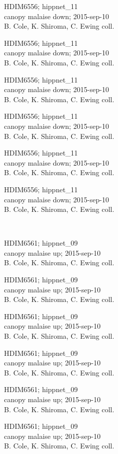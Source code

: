 \documentclass[2pt]{extarticle}
\begin{document}
\noindent
\parbox{0.16\textwidth}{\tiny \raggedright \rule[-0.3\baselineskip]{0pt}{10pt}HDIM6556; hippnet\_11\\ canopy malaise down; 2015-sep-10\\ B. Cole, K. Shiroma, C. Ewing coll.}
\parbox{0.16\textwidth}{\tiny \raggedright \rule[-0.3\baselineskip]{0pt}{10pt}HDIM6556; hippnet\_11\\ canopy malaise down; 2015-sep-10\\ B. Cole, K. Shiroma, C. Ewing coll.}
\parbox{0.16\textwidth}{\tiny \raggedright \rule[-0.3\baselineskip]{0pt}{10pt}HDIM6556; hippnet\_11\\ canopy malaise down; 2015-sep-10\\ B. Cole, K. Shiroma, C. Ewing coll.}
\parbox{0.16\textwidth}{\tiny \raggedright \rule[-0.3\baselineskip]{0pt}{10pt}HDIM6556; hippnet\_11\\ canopy malaise down; 2015-sep-10\\ B. Cole, K. Shiroma, C. Ewing coll.}
\parbox{0.16\textwidth}{\tiny \raggedright \rule[-0.3\baselineskip]{0pt}{10pt}HDIM6556; hippnet\_11\\ canopy malaise down; 2015-sep-10\\ B. Cole, K. Shiroma, C. Ewing coll.}
\parbox{0.16\textwidth}{\tiny \raggedright \rule[-0.3\baselineskip]{0pt}{10pt}HDIM6556; hippnet\_11\\ canopy malaise down; 2015-sep-10\\ B. Cole, K. Shiroma, C. Ewing coll.} \\ 
\vspace{0.001in} 

\noindent
\parbox{0.16\textwidth}{\tiny \raggedright \rule[-0.3\baselineskip]{0pt}{10pt}HDIM6561; hippnet\_09\\ canopy malaise up; 2015-sep-10\\ B. Cole, K. Shiroma, C. Ewing coll.}
\parbox{0.16\textwidth}{\tiny \raggedright \rule[-0.3\baselineskip]{0pt}{10pt}HDIM6561; hippnet\_09\\ canopy malaise up; 2015-sep-10\\ B. Cole, K. Shiroma, C. Ewing coll.}
\parbox{0.16\textwidth}{\tiny \raggedright \rule[-0.3\baselineskip]{0pt}{10pt}HDIM6561; hippnet\_09\\ canopy malaise up; 2015-sep-10\\ B. Cole, K. Shiroma, C. Ewing coll.}
\parbox{0.16\textwidth}{\tiny \raggedright \rule[-0.3\baselineskip]{0pt}{10pt}HDIM6561; hippnet\_09\\ canopy malaise up; 2015-sep-10\\ B. Cole, K. Shiroma, C. Ewing coll.}
\parbox{0.16\textwidth}{\tiny \raggedright \rule[-0.3\baselineskip]{0pt}{10pt}HDIM6561; hippnet\_09\\ canopy malaise up; 2015-sep-10\\ B. Cole, K. Shiroma, C. Ewing coll.}
\parbox{0.16\textwidth}{\tiny \raggedright \rule[-0.3\baselineskip]{0pt}{10pt}HDIM6561; hippnet\_09\\ canopy malaise up; 2015-sep-10\\ B. Cole, K. Shiroma, C. Ewing coll.} \\ 
\vspace{0.001in} 
\end{document}
